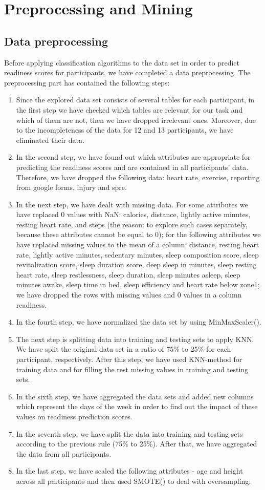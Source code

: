 
\section{Preprocessing and Mining}
\subsection{Data preprocessing}
Before applying classification algorithms to the data set in order to predict readiness scores for participants, we have completed a data preprocessing. The preprocessing part has contained the following steps:
\begin{enumerate}
    \item Since the explored data set consists of several tables for each participant, in the first step we have checked which tables are relevant for our task and which of them are not, then we have dropped irrelevant ones. Moreover, due to the incompleteness of the data for 12 and 13 participants, we have eliminated their data.
    \item In the second step, we have found out which attributes are appropriate for predicting the readiness scores and are contained in all participants' data. Therefore, we have dropped the following data: heart rate, exercise, reporting from google forms, injury and spre.
    \item In the next step, we have dealt with missing data. For some attributes we have replaced 0 values with NaN: calories, distance, lightly active minutes, resting heart rate, and steps (the reason: to explore such cases separately, because these attributes cannot be equal to 0); for the following attributes we have replaced missing values to the mean of a column: distance, resting heart rate, lightly active minutes, sedentary minutes, sleep composition score, sleep revitalization score, sleep duration score, deep sleep in minutes, sleep resting heart rate, sleep restlessness, sleep duration, sleep minutes asleep, sleep minutes awake, sleep time in bed, sleep efficiency and heart rate below zone1; we have dropped the rows with missing values and 0 values in a column readiness.
    \item In the fourth step, we have normalized the data set by using MinMaxScaler().
    \item The next step is splitting data into training and testing sets to apply KNN. We have split the original data set in a ratio of 75\% to 25\% for each participant, respectively. After this step, we have used KNN-method for training data and for filling the rest missing values in training and testing sets.
    \item In the sixth step, we have aggregated the data sets and added new columns which represent the days of the week in order to find out the impact of these values on readiness prediction scores.
    \item In the seventh step, we have split the data into training and testing sets according to the previous rule (75\% to 25\%). After that, we have aggregated the data from all participants.
    \item In the last step, we have scaled the following attributes - age and height across all participants and then used SMOTE() to deal with oversampling.
\end{enumerate}
